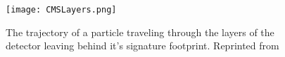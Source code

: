 \begin{figure}[h]
	\centering
	\texttt{[image: CMSLayers.png]}
	\caption[Particle trajectories and footprint in CMS]{The trajectory of a particle traveling through the layers of the detector leaving behind it's signature footprint. Reprinted from \cite{How_CMS_detecs}}
	\label{CMSLayers}
\end{figure}



